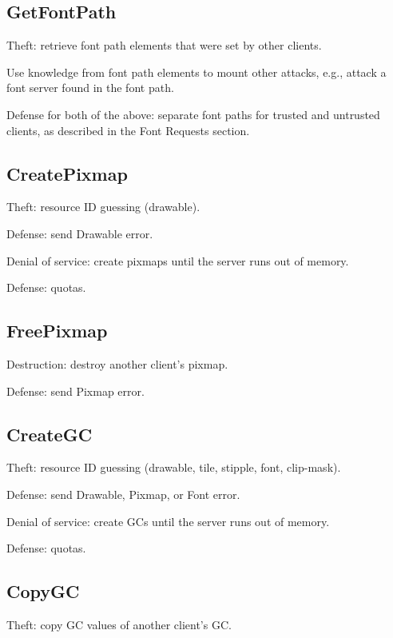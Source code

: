 \documentclass{article}
\begin{document}
\subsection{GetFontPath}

Theft: retrieve font path elements that were set by other clients.

Use knowledge from font path elements to mount other attacks,
e.g., attack a font server found in the font path.

Defense for both of the above: separate font paths for trusted and
untrusted clients, as described in the Font Requests section.



\subsection{CreatePixmap}

Theft: resource ID guessing (drawable).

Defense: send Drawable error.

Denial of service: create pixmaps until the server runs out of memory.

Defense: quotas.



\subsection{FreePixmap}

Destruction: destroy another client's pixmap.

Defense: send Pixmap error.


\subsection{CreateGC}

Theft: resource ID guessing (drawable, tile, stipple, font, clip-mask).

Defense: send Drawable, Pixmap, or Font error.

Denial of service: create GCs until the server runs out of memory.

Defense: quotas.



\subsection{CopyGC}

Theft: copy GC values of another client's GC.
\end{document}

